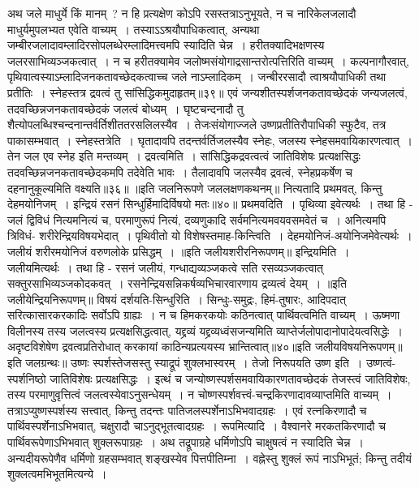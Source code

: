 अथ जले माधुर्ये किं मानम्~? न हि प्रत्यक्षेण कोऽपि रसस्तत्राऽनुभूयते, न च नारिकेलजलादौ माधुर्यमुपलभ्यत एवेति वाच्यम्~। तस्याऽऽश्रयौपाधिकत्वात्,
अन्यथा जम्बीरजलादावम्लादिरसोपलब्धेरम्लादिमत्त्वमपि स्यादिति चेन्न~। हरीतक्यादिभक्षणस्य जलरसाभिव्यञ्जकत्वात्~। न च हरीतक्यामेव जलोष्मसंयोगाद्रसान्तरोत्पत्तिरिति
वाच्यम्~। कल्पनागौरवात्, पृथिवात्वस्याऽम्लादिजनकतावच्छेदकत्वाच्च जले नाऽम्लादिकम्~। जन्बीररसादौ त्वाश्रयौपाधिकी तथा प्रतीतिः~।
स्नेहस्तत्र द्रवत्वं तु सांसिद्धिकमुदाहृतम्॥३९॥
एवं जन्यशीतस्पर्शजनकतावच्छेदकं जन्यजलत्वं, तदवच्छिन्नजनकतावच्छेदकं जलत्वं बोध्यम्~। घृष्टचन्दनादौ तु शैत्योपलब्धिश्चन्दनान्तर्वर्तिशीततरसलिलस्यैव~।
तेजःसंयोगाज्जले उष्णप्रतीतिरौपाधिकी स्फुटैव, तत्र पाकासम्भवात्~।
स्नेहस्तत्रेति~। घृतादावपि तदन्तर्वर्तिजलस्यैव स्नेहः, जलस्य स्नेहसमवायिकारणत्वात्~। तेन जल एव स्नेह इति मन्तव्यम्~।
द्रवत्वमिति~। सांसिद्धिकद्रवत्वत्वं जातिविशेषः प्रत्यक्षसिद्धः तदवच्छिन्नजनकतावच्छेदकमपि तदेवेति भावः~। तैलादावपि जलस्यैव द्रवत्वं, स्नेहप्रकर्षेण च
दहनानुकूल्यमिति वक्ष्यति॥३६॥
॥इति जलनिरूपणे जललक्षणकथनम्॥
नित्यतादि प्रथमवत्, किन्तु देहमयोनिजम्~।
इन्द्रियं रसनं सिन्धुर्हिमादिर्विषयो मतः॥४०॥
प्रथमवदिति~। पृथिव्या इवेत्यर्थः~। तथा हि - जलं द्विविधं नित्यमनित्यं च, परमाणुरूपं नित्यं, दव्यणुकादि सर्वमनित्यमवयवसमवेतं च~। अनित्यमपि त्रिविधं-
शरीरेन्द्रियविषयभेदात्~। पृथिवीतो यो विशेषस्तमाह-किन्त्विति~। देहमयोनिजं-अयोनिजमेवेत्यर्थः~। जलीयं शरीरमयोनिजं वरुणलोके प्रसिद्धम्~।
॥इति जलीयशरीरनिरूपणम्॥
इन्द्रियमिति~। जलीयमित्यर्थः~। तथा हि - रसनं जलीयं, गन्धाद्यव्यञ्जकत्वे सति रसव्यञ्जकत्वात् सक्तुरसाभिव्यञ्जकोदकवत्~। रसनेन्द्रियसन्निकर्षव्यभिचारवारणाय
द्रव्यत्वं देयम्~।
॥इति जलीयेन्द्रियनिरूपणम्॥
विषयं दर्शयति-सिन्धुरिति~। सिन्धुः-समुद्रः, हिमं-तुषारः, आदिपदात् सरित्कासारकरकादिः सर्वोऽपि ग्राह्यः~। न च हिमकरकयोः कठिनत्वात् पार्थिवत्वमिति
वाच्यम्~। ऊष्मणा विलीनस्य तस्य जलत्वस्य प्रत्यक्षसिद्धत्वात्, यद्द्रव्यं यद्द्रव्यध्वंसजन्यमिति व्याप्तेर्जलोपादानोपादेयत्वसिद्धेः~।
अदृष्टविशेषेण द्रवत्वप्रतिरोधात् करकायां काठिन्यप्रत्ययस्य भ्रान्तित्वात्॥४०॥इति जलीयविषयनिरूपणम्॥इति जलग्रन्थः॥
उष्णः स्पर्शस्तेजसस्तु स्याद्रूपं शुक्लभास्वरम्~।
तेजो निरूपयति उष्ण इति~। उष्णत्वं-स्पर्शनिष्ठो जातिविशेषः प्रत्यक्षसिद्धः~। इत्थं च जन्योष्णस्पर्शसमवायिकारणतावच्छेदकं तेजस्त्वं जातिविशेषः, तस्य
परमाणुवृत्तित्वं जलत्वस्येवाऽनुसन्धेयम्~। न चोष्णस्पर्शवत्त्वं-चन्द्रकिरणादावव्याप्तमिति वाच्यम्~। तत्राऽप्युष्णस्पर्शस्य सत्त्वात्, किन्तु तदन्तः पातिजलस्पर्शेनाऽभिभवादग्रहः~।
एवं रत्नकिरणादौ च पार्थिवस्पर्शेनाऽभिभवात्, चक्षुरादौ चाऽनुद्भूतत्वादग्रहः~।
रूपमित्यादि~। वैश्वानरे मरकतकिरणादौ च पार्थिवरूपेणाऽभिभवात् शुक्लरूपाग्रहः~। अथ तद्रूपाग्रहे धर्मिणोऽपि चाक्षुषत्वं न स्यादिति चेन्न~। अन्यदीयरूपेणैव
धर्मिणो ग्रहसम्भवात् शङ्खस्येव पित्तपीतिम्ना~। वह्नेस्तु शुक्लं रूपं नाऽभिभूतं; किन्तु तदीयं शुक्लत्वमभिभूतमित्यन्ये~।
